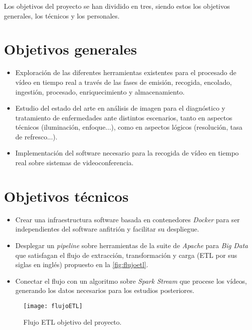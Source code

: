 Los objetivos del proyecto se han dividido en tres, siendo estos los objetivos generales, los técnicos y los personales.

\section{Objetivos generales}

\begin{itemize}
	\item Exploración de las diferentes herramientas existentes para el procesado de vídeo en tiempo real a través de las fases de emisión, recogida, encolado, ingestión, procesado, enriquecimiento y almacenamiento.
	\item Estudio del estado del arte en análisis de imagen para el diagnóstico y tratamiento de enfermedades ante distintos escenarios, tanto en aspectos técnicos (iluminación, enfoque...), como en aspectos lógicos (resolución, tasa de refresco...).
	\item Implementación del software necesario para la recogida de vídeo en tiempo real sobre sistemas de videoconferencia.
\end{itemize}

\section{Objetivos técnicos}

\begin{itemize}
	\item Crear una infraestructura software basada en contenedores \textit{Docker} para ser independientes del software anfitrión y facilitar su despliegue.
	\item Desplegar un \textit{pipeline} sobre herramientas de la suite de \textit{Apache} para \textit{Big Data} que satisfagan el flujo de extracción, transformación y carga (ETL por sus siglas en inglés) propuesto en la \autoref{fig:flujoetl}.
	\item Conectar el flujo con un algoritmo sobre \textit{Spark Stream} que procese los vídeos, generando los datos necesarios para los estudios posteriores. 
\end{itemize}

\begin{figure}
	\centering
	\texttt{[image: flujoETL]}
	\caption{Flujo ETL objetivo del proyecto.}
	\label{fig:flujoetl}
\end{figure}


